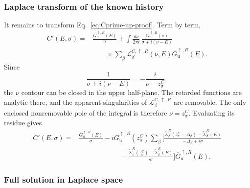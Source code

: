 \documentclass[
 reprint,
 superscriptaddress,
 amsmath,amssymb,
 aps,prb,
 longbibliography,
 floatfix
]{revtex4-2}
\begin{document}
\subsubsection{Laplace transform of the known history}

It remains to transform Eq.~\eqref{eq:Cprime-up-proof}. Term by term,
\begin{align*}
C'(E,\sigma)
={}&
\frac{\overline G_{\mathrm u}^{\uparrow,R}(E)}
{\sigma}
+
\int\frac{d\nu}{2\pi i}\,
\frac{\overline G_{\mathrm u}^{\uparrow,R}(\nu)}
{\sigma+i(\nu-E)}
\\
&\qquad\times
\sum_\beta
\mathcal L_\beta^{C,\uparrow,R}(\nu,E)
\overline G_{\mathrm u}^{\uparrow,R}(E).
\end{align*}
Since
\begin{equation*}
\frac{1}
{\sigma+i(\nu-E)}
=
-\frac{i}{\nu-z_\sigma^C},
\end{equation*}
the $\nu$ contour can be closed in the upper half-plane. The retarded functions are analytic there, and the apparent singularities of $\mathcal L_\beta^{C,\uparrow,R}$ are removable. The only enclosed nonremovable pole of the integral is therefore $\nu=z_\sigma^C$. Evaluating its residue gives
\begin{equation}
\begin{aligned}
C'(E,\sigma)
={}&
\frac{\overline G_{\mathrm u}^{\uparrow,R}(E)}
{\sigma}
-
i\overline G_{\mathrm u}^{\uparrow,R}(z_\sigma^C)
\sum_\beta
\Bigg[
\frac{
\widetilde\Sigma_\beta^R(z_\sigma^C-\Delta_\beta)
-
\widetilde\Sigma_\beta^R(E)}
{-\Delta_\beta+i\sigma}
\\
&\hspace{6em}
-
\frac{
\widetilde\Sigma_\beta^R(z_\sigma^C)
-
\widetilde\Sigma_\beta^R(E)}
{i\sigma}
\Bigg]
\overline G_{\mathrm u}^{\uparrow,R}(E).
\end{aligned}
\label{eq:Cprime-residues-proof}
\end{equation}

\subsubsection{Full solution in Laplace space}
\end{document}
